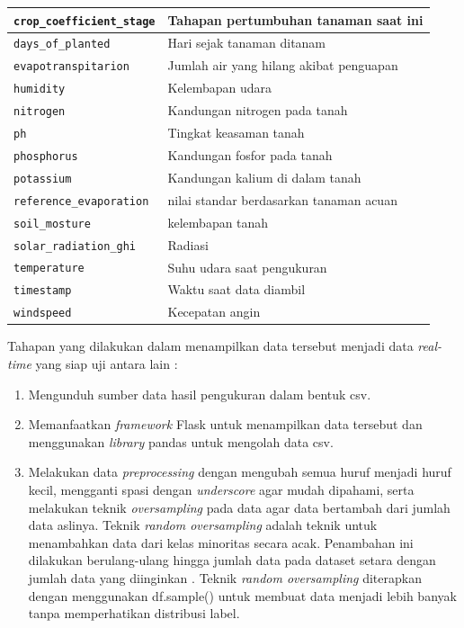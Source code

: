\begin{enumerate}[label={\alph*.}]
\begin{longtable}{|p{.35\linewidth}|p{.60\linewidth}|}
		\texttt{crop\_coefficient\_stage} & Tahapan pertumbuhan tanaman saat ini \\ \hline
		\texttt{days\_of\_planted} & Hari sejak tanaman ditanam \\ \hline
		\texttt{evapotranspitarion} & Jumlah air yang hilang akibat penguapan \\ \hline
		\texttt{humidity} & Kelembapan udara \\ \hline
		\texttt{nitrogen} & Kandungan nitrogen pada tanah \\ \hline
		\texttt{ph} & Tingkat keasaman tanah \\ \hline
		\texttt{phosphorus} & Kandungan fosfor pada tanah \\ \hline
		\texttt{potassium} & Kandungan kalium di dalam tanah \\ \hline
		\texttt{reference\_evaporation} & nilai standar berdasarkan tanaman acuan\\ \hline
		\texttt{soil\_mosture} & kelembapan tanah \\ \hline
		\texttt{solar\_radiation\_ghi} & Radiasi\\ \hline
		\texttt{temperature} & Suhu udara saat pengukuran \\ \hline
		\texttt{timestamp} & Waktu saat data diambil \\ \hline
		\texttt{windspeed} & Kecepatan angin \\ \hline
	\end{longtable}
	Tahapan yang dilakukan dalam menampilkan data tersebut menjadi data \textit{real-time} yang siap uji antara lain : 
	\begin{enumerate}[label={\arabic*.}]
		\item Mengunduh sumber data hasil pengukuran dalam bentuk csv. 
		\item Memanfaatkan \textit{framework} Flask untuk menampilkan data tersebut dan menggunakan \textit{library} pandas untuk mengolah data csv.
		\item Melakukan data \textit{preprocessing} dengan mengubah semua huruf menjadi huruf kecil, mengganti spasi dengan \textit{underscore} agar mudah dipahami, serta melakukan teknik \textit{oversampling} pada data agar data bertambah dari jumlah data aslinya. Teknik \textit{random oversampling} adalah teknik untuk menambahkan data dari kelas minoritas secara acak. Penambahan ini dilakukan berulang-ulang hingga jumlah data pada dataset setara dengan jumlah data yang diinginkan \cite{Diantika2023}. Teknik \textit{random oversampling} diterapkan dengan menggunakan df.sample() untuk membuat data menjadi lebih banyak tanpa memperhatikan distribusi label.

\end{enumerate}
\end{enumerate}
